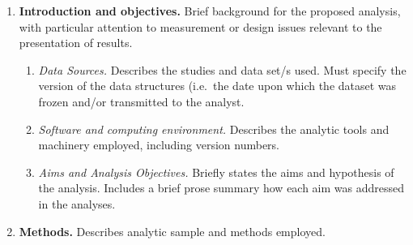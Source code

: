 \documentclass[]{book}
\providecommand{\tightlist}{%
  \setlength{\itemsep}{0pt}\setlength{\parskip}{0pt}}
\theoremstyle{definition}
\theoremstyle{definition}
\theoremstyle{definition}
\theoremstyle{remark}
\begin{document}
\begin{enumerate}
\def\labelenumi{\arabic{enumi}.}
\tightlist
\item
  \textbf{Introduction and objectives.} Brief background for the
  proposed analysis, with particular attention to measurement or design
  issues relevant to the presentation of results.

  \begin{enumerate}
  \def\labelenumii{\alph{enumii}.}
  \tightlist
  \item
    \emph{Data Sources.} Describes the studies and data set/s used. Must
    specify the version of the data structures (i.e.~the date upon which
    the dataset was frozen and/or transmitted to the analyst.
  \item
    \emph{Software and computing environment.} Describes the analytic
    tools and machinery employed, including version numbers.
  \item
    \emph{Aims and Analysis Objectives.} Briefly states the aims and
    hypothesis of the analysis. Includes a brief prose summary how each
    aim was addressed in the analyses.
  \end{enumerate}
\item
  \textbf{Methods.} Describes analytic sample and methods employed.


\end{enumerate}
\end{document}
